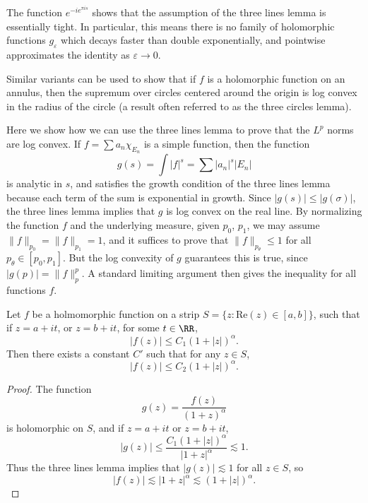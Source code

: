 \begin{remark}
    The function $e^{-ie^{\pi i s}}$ shows that the assumption of the three lines lemma is essentially tight. In particular, this means there is no family of holomorphic functions $g_\varepsilon$ which decays faster than double exponentially, and pointwise approximates the identity as $\varepsilon \to 0$.
\end{remark}

\begin{remark}
    Similar variants can be used to show that if $f$ is a holomorphic function on an annulus, then the supremum over circles centered around the origin is log convex in the radius of the circle (a result often referred to as the three circles lemma).
\end{remark}

\begin{example}
    Here we show how we can use the three lines lemma to prove that the $L^p$ norms are log convex. If $f = \sum a_n \chi_{E_n}$ is a simple function, then the function
    \[ g(s) = \int |f|^s = \sum |a_n|^s |E_n| \]
    is analytic in $s$, and satisfies the growth condition of the three lines lemma because each term of the sum is exponential in growth. Since $|g(s)| \leq |g(\sigma)|$, the three lines lemma implies that $g$ is log convex on the real line. By normalizing the function $f$ and the underlying measure, given $p_0$, $p_1$, we may assume $\| f \|_{p_0} = \| f \|_{p_1} = 1$, and it suffices to prove that $\| f \|_{p_\theta} \leq 1$ for all $p_\theta \in [p_0, p_1]$. But the log convexity of $g$ guarantees this is true, since $|g(p)| = \| f \|_p^p$. A standard limiting argument then gives the inequality for all functions $f$.
\end{example}

\begin{example}
    Let $f$ be a holmomorphic function on a strip $S = \{ z : \text{Re}(z) \in [a,b] \}$, such that if $z = a + it$, or $z = b + it$, for some $t \in \RR$,
    \[ |f(z)| \leq C_1 (1 + |z|)^\alpha. \]
    Then there exists a constant $C'$ such that for any $z \in S$,
    \[ |f(z)| \leq C_2 (1 + |z|)^\alpha. \]
\end{example}
\begin{proof}
    The function
    \[ g(z) = \frac{f(z)}{(1 + z)^\alpha} \]
    is holomorphic on $S$, and if $z = a + it$ or $z = b + it$,
    \[ |g(z)| \leq \frac{C_1 (1 + |z|)^\alpha}{|1 + z|^\alpha} \lesssim 1. \]
    Thus the three lines lemma implies that $|g(z)| \lesssim 1$ for all $z \in S$, so
    \[ |f(z)| \lesssim |1 + z|^\alpha \lesssim (1 + |z|)^\alpha. \]
\end{proof}

